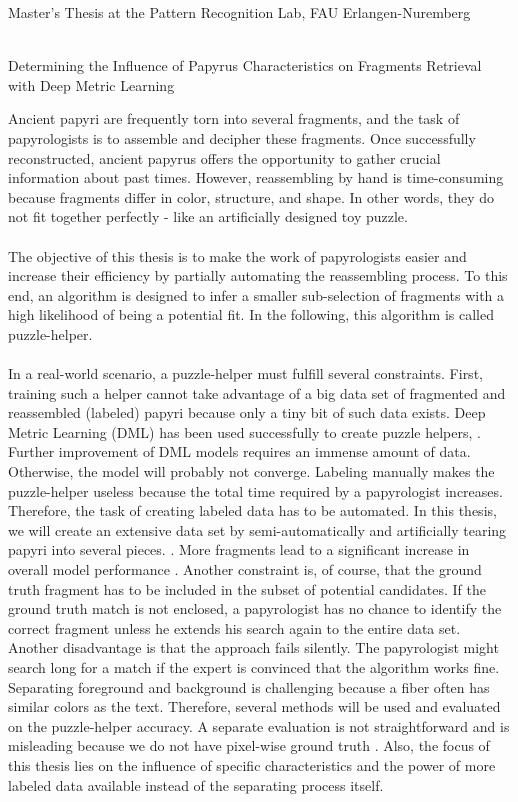 \documentclass[12pt,a4paper]{article}
\begin{document}
\begin{center}
	Master's Thesis at the Pattern Recognition Lab, FAU Erlangen-Nuremberg 
																		
	\mbox{}\\
	{\Large Determining the Influence of Papyrus Characteristics on Fragments Retrieval with Deep Metric Learning}			
\end{center}
Ancient papyri are frequently torn into several fragments, and the task of papyrologists is to assemble and decipher these fragments. Once successfully reconstructed, ancient papyrus offers the opportunity to gather crucial information about past times. However, reassembling by hand is time-consuming because fragments differ in color, structure, and shape. In other words, they do not fit together perfectly - like an artificially designed toy puzzle. 
\\\\
The objective of this thesis is to make the work of papyrologists easier and increase their efficiency by partially automating the reassembling process. To this end, an algorithm is designed to infer a smaller sub-selection of fragments with a high likelihood of being a potential fit. In the following, this algorithm is called puzzle-helper.
\\\\
In a real-world scenario, a puzzle-helper must fulfill several constraints. First, training such a helper cannot take advantage of a big data set of fragmented and reassembled (labeled) papyri because only a tiny bit of such data exists. Deep Metric Learning (DML) has been used successfully to create puzzle helpers, \cite{Ostertag21, Pirrone21}. Further improvement of DML models requires an immense amount of data. Otherwise, the model will probably not converge. Labeling manually makes the puzzle-helper useless because the total time required by a papyrologist increases. Therefore, the task of creating labeled data has to be automated. In this thesis, we will create an extensive data set by semi-automatically and artificially tearing papyri into several pieces. \cite{Seuret21}. More fragments lead to a significant increase in overall model performance \cite{Pirrone21, Ostertag21}.
Another constraint is, of course, that the ground truth fragment has to be included in the subset of potential candidates. If the ground truth match is not enclosed, a papyrologist has no chance to identify the correct fragment unless he extends his search again to the entire data set. Another disadvantage is that the approach fails silently. The papyrologist might search long for a match if the expert is convinced that the algorithm works fine. Separating foreground and background is challenging because a fiber often has similar colors as the text. Therefore, several methods will be used and evaluated on the puzzle-helper accuracy. A separate evaluation is not straightforward and is misleading because we do not have pixel-wise ground truth \cite{Tensmeyer20}. Also, the focus of this thesis lies on the influence of specific characteristics and the power of more labeled data available instead of the separating process itself.
\end{document}

